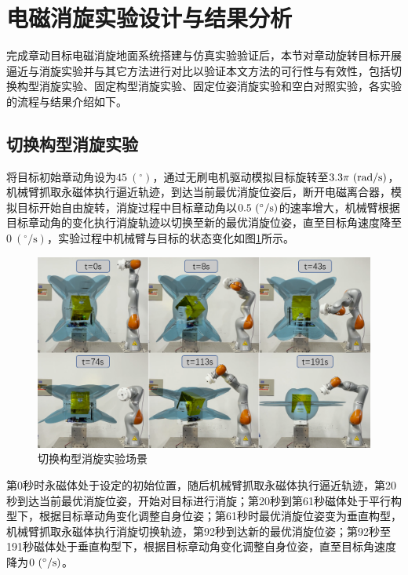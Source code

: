 \documentclass[lang=chs, degree=master, blindreview=false, winfonts=true]{yanputhesis}
\begin{document}
\section{电磁消旋实验设计与结果分析}
完成章动目标电磁消旋地面系统搭建与仿真实验验证后，本节对章动旋转目标开展逼近与消旋实验并与其它方法进行对比以验证本文方法的可行性与有效性，包括切换构型消旋实验、固定构型消旋实验、固定位姿消旋实验和空白对照实验，各实验的流程与结果介绍如下。

\subsection{切换构型消旋实验}
将目标初始章动角设为$45\ (^\circ)$，通过无刷电机驱动模拟目标旋转至$3.3\pi\ \rm{(rad/s)}$，机械臂抓取永磁体执行逼近轨迹，到达当前最优消旋位姿后，断开电磁离合器，模拟目标开始自由旋转，消旋过程中目标章动角以$0.5\ \rm{(^\circ/s)}$的速率增大，机械臂根据目标章动角的变化执行消旋轨迹以切换至新的最优消旋位姿，直至目标角速度降至$0\ (\mathrm{^\circ/s})$，实验过程中机械臂与目标的状态变化如图\ref{fig:change_exp}所示。
\begin{figure}[htbp]
	\centering
	\includegraphics[width = 5.4in]{picture/change_exp.png}
	\caption{切换构型消旋实验场景}
	\label{fig:change_exp}
\end{figure}

第0秒时永磁体处于设定的初始位置，随后机械臂抓取永磁体执行逼近轨迹，第20秒到达当前最优消旋位姿，开始对目标进行消旋；第20秒到第61秒磁体处于平行构型下，根据目标章动角变化调整自身位姿；第61秒时最优消旋位姿变为垂直构型，机械臂抓取永磁体执行消旋切换轨迹，第92秒到达新的最优消旋位姿；第92秒至191秒磁体处于垂直构型下，根据目标章动角变化调整自身位姿，直至目标角速度降为$0\ \rm{(^\circ/s)}$。
\end{document}

